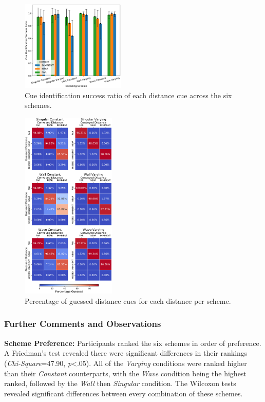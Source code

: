 \documentclass{mpaper}
\begin{document}
\begin{figure}[h]
    \centering
    \includegraphics[width=0.44\textwidth]{dissertation/images/Mean Correct by Encoding Scheme.pdf}
    \caption{Cue identification success ratio of each distance cue across the six schemes.}
    \label{fig:mean-correct}
\end{figure}

\begin{figure}[h]
    \centering
    \includegraphics[width=0.40\textwidth]{dissertation/images/heatmaps.pdf}
    \caption{Percentage of guessed distance cues for each distance per scheme.}
    \label{fig:heatmaps}
\end{figure}




\subsubsection{Further Comments and Observations}
\textbf{Scheme Preference:}
Participants ranked the six schemes in order of preference. A Friedman's test revealed there were significant differences in their rankings (\textit{Chi-Square}=47.90, \textit{p}<.05). All of the \textit{Varying} conditions were ranked higher than their \textit{Constant} counterparts, with the \textit{Wave} condition being the highest ranked, followed by the \textit{Wall} then \textit{Singular} condition. The Wilcoxon tests revealed significant differences between every combination of these schemes.
\end{document}
